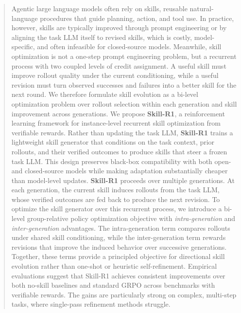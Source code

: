\begin{abstract}
Agentic large language models often rely on skills, reusable natural-language procedures that guide planning, action, and tool use.
In practice, however, skills are typically improved through prompt engineering or by aligning the task LLM itself to revised skills, 
which is costly, model-specific, and often infeasible for closed-source models.
Meanwhile, skill optimization is not a one-step prompt engineering problem, but a recurrent process with two coupled levels of credit assignment.
A useful skill must improve rollout quality under the current conditioning, while a useful revision must turn observed successes and failures into a better skill for the next round.
We therefore formulate skill evolution as a bi-level optimization problem over rollout selection within each generation and skill improvement across generations.
We propose \textbf{Skill-R1}, a reinforcement learning framework for instance-level recurrent skill optimization from verifiable rewards.
Rather than updating the task LLM, \textbf{Skill-R1} trains a lightweight skill generator that conditions on the task context, 
prior rollouts, and their verified outcomes to produce skills that steer a frozen task LLM.
This design preserves black-box compatibility with both open- and closed-source models while making adaptation substantially cheaper than model-level updates.
\textbf{Skill-R1} proceeds over multiple generations. At each generation, the current skill induces rollouts from the task LLM, whose verified outcomes are fed back to produce the next revision.
To optimize the skill generator over this recurrent process, we introduce a bi-level group-relative policy optimization objective with \textit{intra-generation} and \textit{inter-generation} advantages.
The intra-generation term compares rollouts under shared skill conditioning, while the inter-generation term rewards revisions that improve the induced behavior over successive generations.
Together, these terms provide a principled objective for directional skill evolution rather than one-shot or heuristic self-refinement.
Empirical evaluations suggest that Skill-R1 achieves consistent improvements over both no-skill baselines and standard GRPO across benchmarks with verifiable rewards. The gains are particularly strong on complex, multi-step tasks, where single-pass refinement methods struggle.
\end{abstract}



